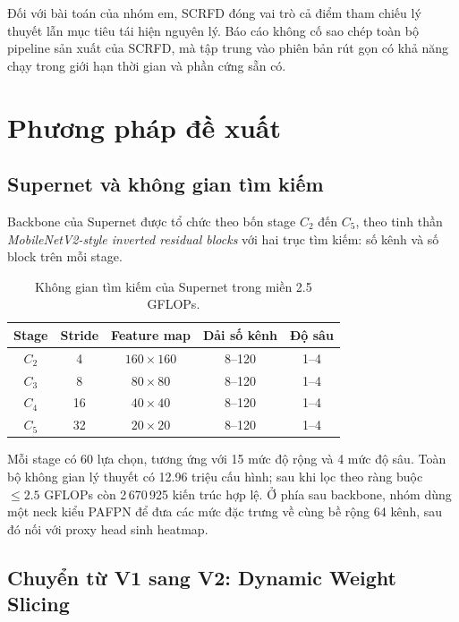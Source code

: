 Đối với bài toán của nhóm em, SCRFD đóng vai trò cả điểm tham chiếu lý thuyết lẫn mục tiêu tái hiện nguyên lý. Báo cáo không cố sao chép toàn bộ pipeline sản xuất của SCRFD, mà tập trung vào phiên bản rút gọn có khả năng chạy trong giới hạn thời gian và phần cứng sẵn có.

\chapter{Phương pháp đề xuất}

\section{Supernet và không gian tìm kiếm}

Backbone của Supernet được tổ chức theo bốn stage \(C_2\) đến \(C_5\), theo tinh thần \textit{MobileNetV2-style inverted residual blocks} với hai trục tìm kiếm: số kênh và số block trên mỗi stage. \cite{howard2018mobilenetv2}

\begin{table}[H]
\centering
\caption{Không gian tìm kiếm của Supernet trong miền 2.5 GFLOPs.}
\begin{tabular}{@{}ccccc@{}}
\toprule
\textbf{Stage} & \textbf{Stride} & \textbf{Feature map} & \textbf{Dải số kênh} & \textbf{Độ sâu} \\
\midrule
\(C_2\) & 4  & \(160 \times 160\) & 8--120 & 1--4 \\
\(C_3\) & 8  & \(80 \times 80\)   & 8--120 & 1--4 \\
\(C_4\) & 16 & \(40 \times 40\)   & 8--120 & 1--4 \\
\(C_5\) & 32 & \(20 \times 20\)   & 8--120 & 1--4 \\
\bottomrule
\end{tabular}
\end{table}

Mỗi stage có 60 lựa chọn, tương ứng với 15 mức độ rộng và 4 mức độ sâu. Toàn bộ không gian lý thuyết có 12.96 triệu cấu hình; sau khi lọc theo ràng buộc \(\leq 2.5\) GFLOPs còn 2\,670\,925 kiến trúc hợp lệ. Ở phía sau backbone, nhóm dùng một neck kiểu PAFPN để đưa các mức đặc trưng về cùng bề rộng 64 kênh, sau đó nối với proxy head sinh heatmap. \cite{liu2018panet}

\section{Chuyển từ V1 sang V2: Dynamic Weight Slicing}

